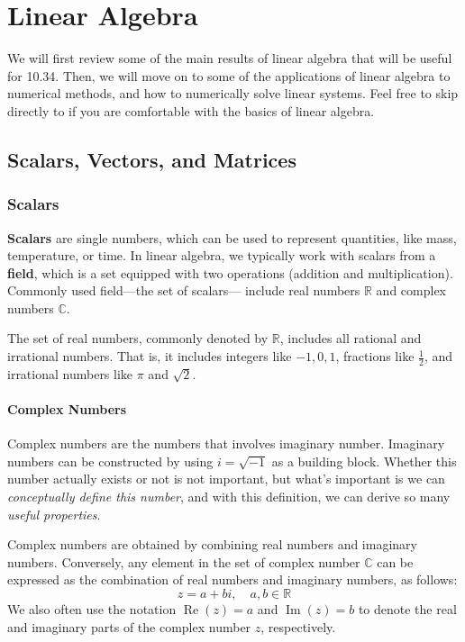 \chapter{Linear Algebra}
We will first review some of the main results of linear algebra that will be useful for 10.34. Then, we will move on to some of the applications of linear algebra to numerical methods, and how to numerically solve linear systems. Feel free to skip directly to  if you are comfortable with the basics of linear algebra.

\section{Scalars, Vectors, and Matrices}
\subsection{Scalars}
\textbf{Scalars} are single numbers, which can be used to represent quantities, like mass, temperature, or time. In linear algebra, we typically work with scalars from a \textbf{field}, which is a set equipped with two operations (addition and multiplication). Commonly used field---the set of scalars--- include real numbers $ \mathbb{R} $ and complex numbers $ \mathbb{C} $.

The set of real numbers, commonly denoted by $ \mathbb{R} $, includes all rational and irrational numbers.
That is, it includes integers like $-1, 0, 1$, fractions like $ \frac{1}{2} $, and irrational numbers like $ \pi $ and $ \sqrt{2} $.


\subsubsection*{Complex Numbers}
Complex numbers are the numbers that involves imaginary number.
Imaginary numbers can be constructed by using $i=\sqrt{-1}$ as a building block.
Whether this number actually exists or not is not important, but what’s important is we can \emph{conceptually define this number}, and with this definition, we can derive so many \emph{useful properties}.

Complex numbers are obtained by combining real numbers and imaginary numbers.
Conversely, any element in the set of complex number $\mathbb{C}$ can be expressed as the combination of real numbers and imaginary numbers, as follows:
\begin{equation*}
    z = a + b i, \quad a, b \in \mathbb{R}
\end{equation*}
We also often use the notation $ \operatorname{Re}(z) = a $ and $ \operatorname{Im}(z) = b $ to denote the real and imaginary parts of the complex number $ z $, respectively.

